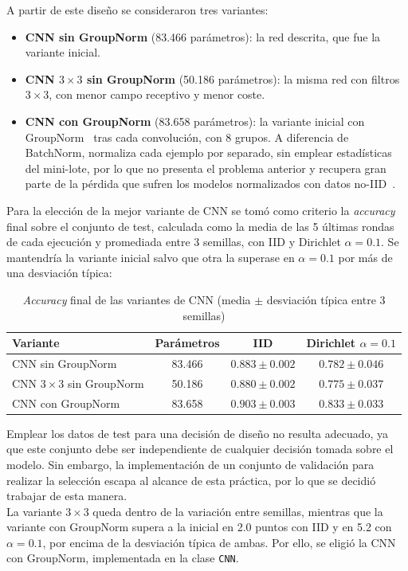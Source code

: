 A partir de este diseño se consideraron tres variantes:

\begin{itemize}
    \item \textbf{CNN sin GroupNorm} (83.466 parámetros): la red descrita, que fue la variante inicial.
    \item \textbf{CNN $3 \times 3$ sin GroupNorm} (50.186 parámetros): la misma red con filtros $3 \times 3$, con
    menor campo receptivo y menor coste.
    \item \textbf{CNN con GroupNorm} (83.658 parámetros): la variante inicial con GroupNorm~\cite{groupnorm} tras
    cada convolución, con 8 grupos. A diferencia de BatchNorm, normaliza cada ejemplo por separado, sin emplear
    estadísticas del mini-lote, por lo que no presenta el problema anterior y recupera gran parte de la pérdida
    que sufren los modelos normalizados con datos no-IID~\cite{hsieh}.
\end{itemize}

Para la elección de la mejor variante de CNN se tomó como criterio la \textit{accuracy} final sobre el conjunto de
test, calculada como la media de las 5 últimas rondas de cada ejecución y promediada entre 3 semillas, con IID y
Dirichlet $\alpha=0.1$. Se mantendría la variante inicial salvo que otra la superase en $\alpha=0.1$ por más de una
desviación típica:

\begin{table}[H]
    \centering
    \caption{\textit{Accuracy} final de las variantes de CNN (media $\pm$ desviación típica entre 3 semillas)}
    \label{tab:cnn_variantes}
    \setlength{\tabcolsep}{5pt}
    \begin{tabular}{lccc}
        \hline
        Variante & Parámetros & IID & Dirichlet $\alpha=0.1$ \\
        \hline
        CNN sin GroupNorm & 83.466 & $0.883 \pm 0.002$ & $0.782 \pm 0.046$ \\
        CNN $3 \times 3$ sin GroupNorm & 50.186 & $0.880 \pm 0.002$ & $0.775 \pm 0.037$ \\
        CNN con GroupNorm & 83.658 & $0.903 \pm 0.003$ & $0.833 \pm 0.033$ \\
        \hline
    \end{tabular}
\end{table}

Emplear los datos de test para una decisión de diseño no resulta adecuado, ya que este conjunto debe ser
independiente de cualquier decisión tomada sobre el modelo. Sin embargo, la implementación de un conjunto de
validación para realizar la selección escapa al alcance de esta práctica, por lo que se decidió trabajar de esta
manera.
\\

La variante $3 \times 3$ queda dentro de la variación entre semillas, mientras que la variante con GroupNorm supera
a la inicial en 2.0 puntos con IID y en 5.2 con $\alpha=0.1$, por encima de la desviación típica de ambas. Por ello,
se eligió la CNN con GroupNorm, implementada en la clase \texttt{CNN}.
